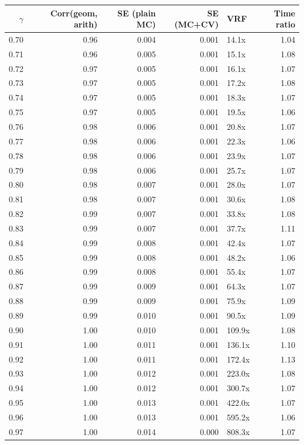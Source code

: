 \begin{tabular}{rrrrlr}
\toprule
$\gamma$ & Corr(geom, arith) & SE (plain MC) & SE (MC+CV) & VRF & Time ratio \\
\midrule
0.70 & 0.96 & 0.004 & 0.001 & 14.1x & 1.04 \\
0.71 & 0.96 & 0.005 & 0.001 & 15.1x & 1.08 \\
0.72 & 0.97 & 0.005 & 0.001 & 16.1x & 1.07 \\
0.73 & 0.97 & 0.005 & 0.001 & 17.2x & 1.08 \\
0.74 & 0.97 & 0.005 & 0.001 & 18.3x & 1.07 \\
0.75 & 0.97 & 0.005 & 0.001 & 19.5x & 1.06 \\
0.76 & 0.98 & 0.006 & 0.001 & 20.8x & 1.07 \\
0.77 & 0.98 & 0.006 & 0.001 & 22.3x & 1.06 \\
0.78 & 0.98 & 0.006 & 0.001 & 23.9x & 1.07 \\
0.79 & 0.98 & 0.006 & 0.001 & 25.7x & 1.07 \\
0.80 & 0.98 & 0.007 & 0.001 & 28.0x & 1.07 \\
0.81 & 0.98 & 0.007 & 0.001 & 30.6x & 1.08 \\
0.82 & 0.99 & 0.007 & 0.001 & 33.8x & 1.08 \\
0.83 & 0.99 & 0.007 & 0.001 & 37.7x & 1.11 \\
0.84 & 0.99 & 0.008 & 0.001 & 42.4x & 1.07 \\
0.85 & 0.99 & 0.008 & 0.001 & 48.2x & 1.06 \\
0.86 & 0.99 & 0.008 & 0.001 & 55.4x & 1.07 \\
0.87 & 0.99 & 0.009 & 0.001 & 64.3x & 1.07 \\
0.88 & 0.99 & 0.009 & 0.001 & 75.9x & 1.09 \\
0.89 & 0.99 & 0.010 & 0.001 & 90.5x & 1.09 \\
0.90 & 1.00 & 0.010 & 0.001 & 109.9x & 1.08 \\
0.91 & 1.00 & 0.011 & 0.001 & 136.1x & 1.10 \\
0.92 & 1.00 & 0.011 & 0.001 & 172.4x & 1.13 \\
0.93 & 1.00 & 0.012 & 0.001 & 223.0x & 1.08 \\
0.94 & 1.00 & 0.012 & 0.001 & 300.7x & 1.07 \\
0.95 & 1.00 & 0.013 & 0.001 & 422.0x & 1.07 \\
0.96 & 1.00 & 0.013 & 0.001 & 595.2x & 1.06 \\
0.97 & 1.00 & 0.014 & 0.000 & 808.3x & 1.07 \\

\end{tabular}
